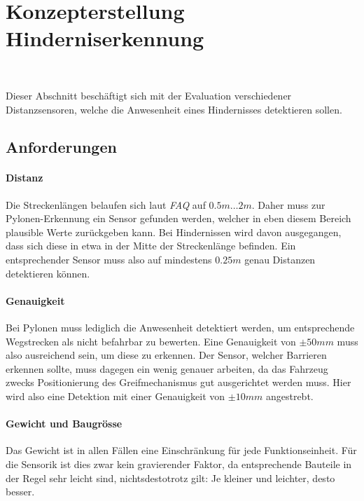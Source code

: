 \documentclass[main.tex]{subfiles} %
\begin{document}

\section{Konzepterstellung Hinderniserkennung}~\label{appendix:Hinderniserkennung}

Dieser Abschnitt beschäftigt sich mit der Evaluation verschiedener
Distanzsensoren, welche die Anwesenheit eines Hindernisses detektieren sollen.

\subsection*{Anforderungen}

\paragraph{Distanz}
Die Streckenlängen belaufen sich laut \textit{FAQ} auf $0.5m \dots 2m$. Daher
muss zur Pylonen-Erkennung ein Sensor gefunden werden, welcher in eben diesem
Bereich plausible Werte zurückgeben kann. Bei Hindernissen wird davon
ausgegangen, dass sich diese in etwa in der Mitte der Streckenlänge befinden.
Ein entsprechender Sensor muss also auf mindestens $0.25 m$ genau Distanzen
detektieren können.

\paragraph{Genauigkeit}
Bei Pylonen muss lediglich die Anwesenheit detektiert werden, um entsprechende
Wegstrecken als nicht befahrbar zu bewerten. Eine Genauigkeit von $\pm 50 mm$
muss also ausreichend sein, um diese zu erkennen. Der Sensor, welcher Barrieren
erkennen sollte, muss dagegen ein wenig genauer arbeiten, da das Fahrzeug
zwecks Positionierung des Greifmechanismus gut ausgerichtet werden muss. Hier
wird also eine Detektion mit einer Genauigkeit von $\pm 10 mm$ angestrebt.

\paragraph{Gewicht und Baugrösse}
Das Gewicht ist in allen Fällen eine Einschränkung für jede Funktionseinheit.
Für die Sensorik ist dies zwar kein gravierender Faktor, da entsprechende
Bauteile in der Regel sehr leicht sind, nichtsdestotrotz gilt: Je kleiner und
leichter, desto besser.
\end{document}
